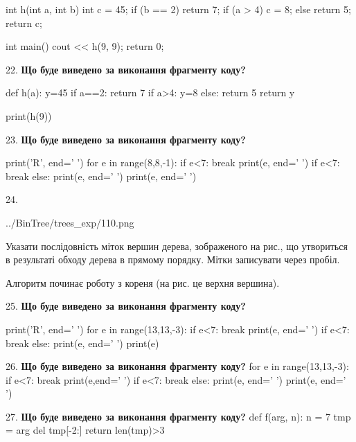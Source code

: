 \documentclass[11pt]{article}
\begin{document}
int h(int a, int b){
    int c = 45;
    if (b == 2)
        return 7;
    if (a > 4)
         c = 8;
    else 
        return 5;
    return c;
}

int main(){
    cout << h(9, 9);
    return 0;
}
\par\vspace{5mm}
22. \textbf{Що буде виведено за виконання фрагменту коду?}

def h(a):
    y=45
    if a==2: 
        return 7
    if a>4:
         y=8
    else:
         return 5
    return y

print(h(9))
\par\vspace{5mm}
23. \textbf{Що буде виведено за виконання фрагменту коду?}

print('R', end=' ')
for e in range(8,8,-1):
    if e<7:
        break
        print(e, end=' ')
    if e<7:
        break
    else:
        print(e, end=' ')
    print(e, end=' ')
\par\vspace{5mm}
24. 

\begin{center}
	{../BinTree/trees_exp/110.png}
\end{center}
Указати послідовність міток вершин дерева, зображеного на рис., що утвориться в результаті обходу дерева в прямому порядку. Мітки записувати через пробіл.\par Алгоритм починає роботу з кореня (на рис. це верхня вершина).
\par\vspace{5mm}
25. \textbf{Що буде виведено за виконання фрагменту коду?}

print('R', end=' ')
for e in range(13,13,-3):
    if e<7:
        break
        print(e, end=' ')
    if e<7:
        break
    else:
        print(e, end=' ')
    print(e)
\par\vspace{5mm}
26. \textbf{Що буде виведено за виконання фрагменту коду?}
for e in range(13,13,-3):
    if e<7:
        break
        print(e,end=' ')
    if e<7:
        break
else:
    print(e, end=' ')
print(e, end=' ')
\par\vspace{5mm}
27. \textbf{Що буде виведено за виконання фрагменту коду?}
def f(arg, n):
    n = 7
    tmp = arg
    del tmp[-2:]
    return len(tmp)>3
\end{document}
